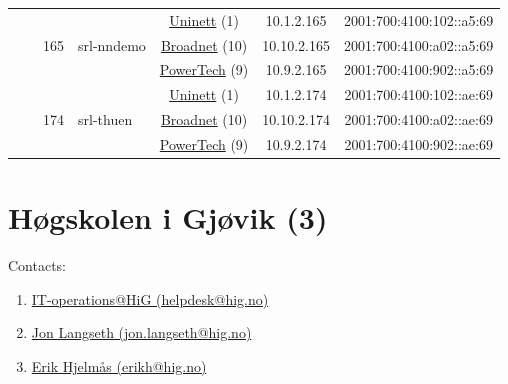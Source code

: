 \begin{small}
\begin{center}
\begin{longtable}{|c|c|c|c|c|c|c|c|}
  &  & \multirow{3}{*}{\tiny{165}} & \multicolumn{1}{|l|}{\multirow{3}{*}{\tiny{srl-nndemo}}} & \multicolumn{2}{|c|}{\tiny{\href{https://www.uninett.no}{Uninett} (1)}} & \tiny{10.1.2.165} & \tiny{2001:700:4100:102::a5:69} \\* \cline{5-5}\cline{6-6}\cline{7-7}\cline{8-8}
  &  &  &  & \multicolumn{2}{|c|}{\tiny{\href{https://www.broadnet.no}{Broadnet} (10)}} & \tiny{10.10.2.165} & \tiny{2001:700:4100:a02::a5:69} \\* \cline{5-5}\cline{6-6}\cline{7-7}\cline{8-8}
  &  &  &  & \multicolumn{2}{|c|}{\tiny{\href{http://www.powertech.no}{PowerTech} (9)}} & \tiny{10.9.2.165} & \tiny{2001:700:4100:902::a5:69} \\* \cline{3-3}\cline{4-4}\cline{5-5}\cline{6-6}\cline{7-7}\cline{8-8}
  &  & \multirow{3}{*}{\tiny{174}} & \multicolumn{1}{|l|}{\multirow{3}{*}{\tiny{srl-thuen}}} & \multicolumn{2}{|c|}{\tiny{\href{https://www.uninett.no}{Uninett} (1)}} & \tiny{10.1.2.174} & \tiny{2001:700:4100:102::ae:69} \\* \cline{5-5}\cline{6-6}\cline{7-7}\cline{8-8}
  &  &  &  & \multicolumn{2}{|c|}{\tiny{\href{https://www.broadnet.no}{Broadnet} (10)}} & \tiny{10.10.2.174} & \tiny{2001:700:4100:a02::ae:69} \\* \cline{5-5}\cline{6-6}\cline{7-7}\cline{8-8}
  &  &  &  & \multicolumn{2}{|c|}{\tiny{\href{http://www.powertech.no}{PowerTech} (9)}} & \tiny{10.9.2.174} & \tiny{2001:700:4100:902::ae:69} \\ \hline
\end{longtable}
\end{center}
\end{small}



\section{Høgskolen i Gjøvik (3)}
\label{sec:HiG}

Contacts:
\begin{enumerate}
 \item {}\href{mailto:helpdesk@hig.no}{IT-operations@HiG (helpdesk@hig.no)}
 \item {}\href{mailto:jon.langseth@hig.no}{Jon Langseth (jon.langseth@hig.no)}
 \item {}\href{mailto:erikh@hig.no}{Erik Hjelmås (erikh@hig.no)}
\end{enumerate}

